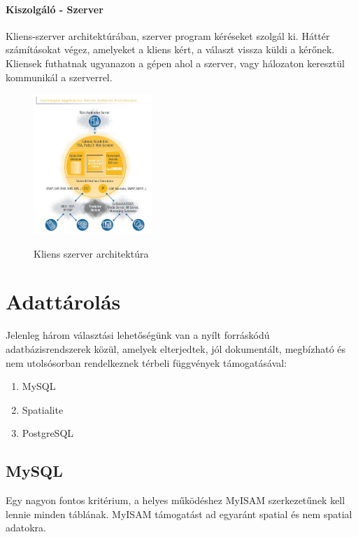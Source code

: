   \paragraph{Kiszolgáló - Szerver} %
  Kliens-szerver architektúrában, szerver program kéréseket szolgál ki. Háttér számításokat végez, amelyeket a kliens kért, a választ vissza küldi a kérőnek. Kliensek futhatnak ugyanazon a gépen ahol a szerver, vagy hálozaton keresztül kommunikál a szerverrel.
  \begin{figure}[h!]
    \centering
  	\includegraphics[width=0.4\textwidth]{chapters/chap3/appserver.jpg}\\
  	\caption{Kliens szerver architektúra}
  \end{figure}


\section{Adattárolás} %
\label{sec:adattárolás}
  Jelenleg három választási lehetőségünk van a nyílt forráskódú adatbázisrendszerek közül, amelyek elterjedtek, jól dokumentált, megbízható és nem utolsósorban rendelkeznek térbeli függvények támogatásával:
  \begin{enumerate}
    \item MySQL
    \item Spatialite
    \item PostgreSQL
  \end{enumerate}
	\subsection{MySQL} %
	\label{sub:mysql}
	Egy nagyon fontos kritérium, a helyes működéshez MyISAM szerkezetűnek kell lennie minden táblának. MyISAM támogatást ad egyaránt spatial és nem spatial adatokra.
	
